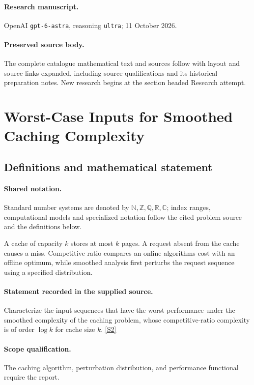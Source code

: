 \documentclass[11pt]{article}
\begin{document}
\paragraph{Research manuscript.} OpenAI \texttt{gpt-6-astra}, reasoning \texttt{ultra}; 11 October 2026.
\paragraph{Preserved source body.} The complete catalogue mathematical text and sources follow with layout and source links expanded, including source qualifications and its historical preparation notes. New research begins at the section headed Research attempt.

\section{Worst-Case Inputs for Smoothed Caching Complexity}\label{statement}

\subsection{Definitions and mathematical statement}

\paragraph{Shared notation.}Standard number systems are denoted by $\mathbb N,\mathbb Z,\mathbb Q,\mathbb R,\mathbb C$; index ranges, computational models and specialized notation follow the cited problem source and the definitions below.


A cache of capacity $k$ stores at most $k$ pages. A request absent from the cache causes a miss. Competitive ratio compares an online algorithm\textquotesingle s cost with an offline optimum, while smoothed analysis first perturbs the request sequence using a specified distribution.
\paragraph{Statement recorded in the supplied source.}
Characterize the input sequences that have the worst performance under the smoothed complexity of the caching problem, whose competitive-ratio complexity is of order $\log k$ for cache size $k$. \href{https://doi.org/10.4171/owr/2013/18}{[S2]}
\paragraph{Scope qualification.}
The caching algorithm, perturbation distribution, and performance functional require the report.
\end{document}
